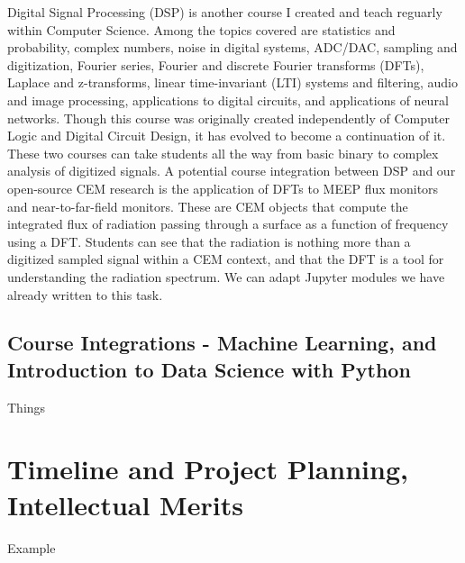 \documentclass[../../main.tex]{subfiles}
\begin{document}
Digital Signal Processing (DSP) is another course I created and teach reguarly within Computer Science.  Among the topics covered are statistics and probability, complex numbers, noise in digital systems, ADC/DAC, sampling and digitization, Fourier series, Fourier and discrete Fourier transforms (DFTs), Laplace and z-transforms, linear time-invariant (LTI) systems and filtering, audio and image processing, applications to digital circuits, and applications of neural networks.  Though this course was originally created independently of Computer Logic and Digital Circuit Design, it has evolved to become a continuation of it.  These two courses can take students all the way from basic binary to complex analysis of digitized signals.  A potential course integration between DSP and our open-source CEM research is the application of DFTs to MEEP flux monitors and near-to-far-field monitors.  These are CEM objects that compute the integrated flux of radiation passing through a surface as a function of frequency using a DFT.  Students can see that the radiation is nothing more than a digitized sampled signal within a CEM context, and that the DFT is a tool for understanding the radiation spectrum.  We can adapt Jupyter modules we have already written to this task. \\ \vspace{2.5mm}

\subsection{Course Integrations - Machine Learning, and Introduction to Data Science with Python}

Things

\section{Timeline and Project Planning, Intellectual Merits}
\label{sec:time_im}

Example
\end{document}
